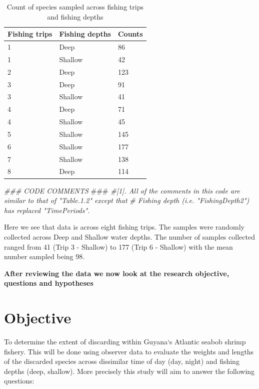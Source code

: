 \documentclass[
]{book}
\newenvironment{Shaded}{\begin{snugshade}}{\end{snugshade}}
\newcommand{\AlertTok}[1]{\textcolor[rgb]{0.94,0.16,0.16}{#1}}
\newcommand{\CommentTok}[1]{\textcolor[rgb]{0.56,0.35,0.01}{\textit{#1}}}
\begin{document}
\begin{table}

\caption{\label{tab:unnamed-chunk-4}Count of species sampled across fishing trips and fishing depths}
\centering
\begin{tabular}[t]{l|l|l}
\hline
\textbf{Fishing trips} & \textbf{Fishing depths} & \textbf{Counts}\\
\hline
1 & Deep & 86\\
\hline
1 & Shallow & 42\\
\hline
2 & Deep & 123\\
\hline
3 & Deep & 91\\
\hline
3 & Shallow & 41\\
\hline
4 & Deep & 71\\
\hline
4 & Shallow & 45\\
\hline
5 & Shallow & 145\\
\hline
6 & Shallow & 177\\
\hline
7 & Shallow & 138\\
\hline
8 & Deep & 114\\
\hline
\end{tabular}
\end{table}

\begin{Shaded}
\begin{Highlighting}[]
\CommentTok{### CODE COMMENTS }\AlertTok{###}
\CommentTok{#[1]. All of the comments in this code are similar to that of "Table.1.2" except that }
\CommentTok{#     Fishing depth (i.e. "FishingDepth2") has replaced "TimePeriods".}
\end{Highlighting}
\end{Shaded}

Here we see that data is across eight fishing trips. The samples were randomly collected across Deep and Shallow water depths. The number of samples collected ranged from 41 (Trip 3 - Shallow) to 177 (Trip 6 - Shallow) with the mean number sampled being 98.

\textbf{After reviewing the data we now look at the research objective, questions and hypotheses}

\hypertarget{objective}{%
\section{Objective}\label{objective}}

To determine the extent of discarding within Guyana`s Atlantic seabob shrimp fishery. This will be done using observer data to evaluate the weights and lengths of the discarded species across dissimilar time of day (day, night) and fishing depths (deep, shallow). More precisely this study will aim to answer the following questions:
\end{document}

